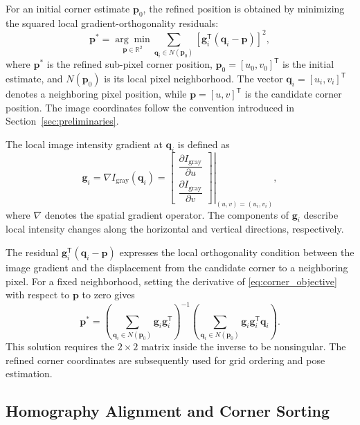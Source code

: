 \documentclass[journal]{IEEEtran}
\begin{document}
For an initial corner estimate $\mathbf{p}_0$,
the refined position is obtained by minimizing
the squared local gradient-orthogonality residuals:
\begin{equation}
\label{eq:corner_objective}
\mathbf{p}^{*}
=
\underset{\mathbf{p}\in\mathbb{R}^{2}}{\arg\min}
\sum_{\mathbf{q}_i\in N(\mathbf{p}_0)}
\left[
\mathbf{g}_i^{\mathsf{T}}
(\mathbf{q}_i-\mathbf{p})
\right]^2,
\end{equation}
where $\mathbf{p}^{*}$ is the refined sub-pixel
corner position, $\mathbf{p}_0=[u_0,v_0]^{\mathsf{T}}$
is the initial estimate, and $N(\mathbf{p}_0)$
is its local pixel neighborhood.
The vector $\mathbf{q}_i=[u_i,v_i]^{\mathsf{T}}$
denotes a neighboring pixel position, while
$\mathbf{p}=[u,v]^{\mathsf{T}}$ is the candidate
corner position. The image coordinates follow
the convention introduced in
Section~\ref{sec:preliminaries}.

The local image intensity gradient at $\mathbf{q}_i$
is defined as
\[
\mathbf{g}_i
=
\nabla I_{\text{gray}}(\mathbf{q}_i)
=
\left.
\begin{bmatrix}
\dfrac{\partial I_{\text{gray}}}{\partial u}\\[4pt]
\dfrac{\partial I_{\text{gray}}}{\partial v}
\end{bmatrix}
\right|_{(u,v)=(u_i,v_i)},
\]
where $\nabla$ denotes the spatial gradient operator.
The components of $\mathbf{g}_i$ describe local
intensity changes along the horizontal and vertical
directions, respectively.

The residual
$\mathbf{g}_i^{\mathsf{T}}(\mathbf{q}_i-\mathbf{p})$
expresses the local orthogonality condition between
the image gradient and the displacement from the
candidate corner to a neighboring pixel.
For a fixed neighborhood, setting the derivative
of \eqref{eq:corner_objective} with respect to
$\mathbf{p}$ to zero gives
\begin{equation}
\label{eq:corner_solution}
\mathbf{p}^{*}
=
\left(
\sum_{\mathbf{q}_i\in N(\mathbf{p}_0)}
\mathbf{g}_i\mathbf{g}_i^{\mathsf{T}}
\right)^{-1}
\left(
\sum_{\mathbf{q}_i\in N(\mathbf{p}_0)}
\mathbf{g}_i\mathbf{g}_i^{\mathsf{T}}\mathbf{q}_i
\right).
\end{equation}
This solution requires the $2\times2$ matrix
inside the inverse to be nonsingular.
The refined corner coordinates are subsequently
used for grid ordering and pose estimation.

\subsection{Homography Alignment and Corner Sorting}
\label{homography}
\end{document}
